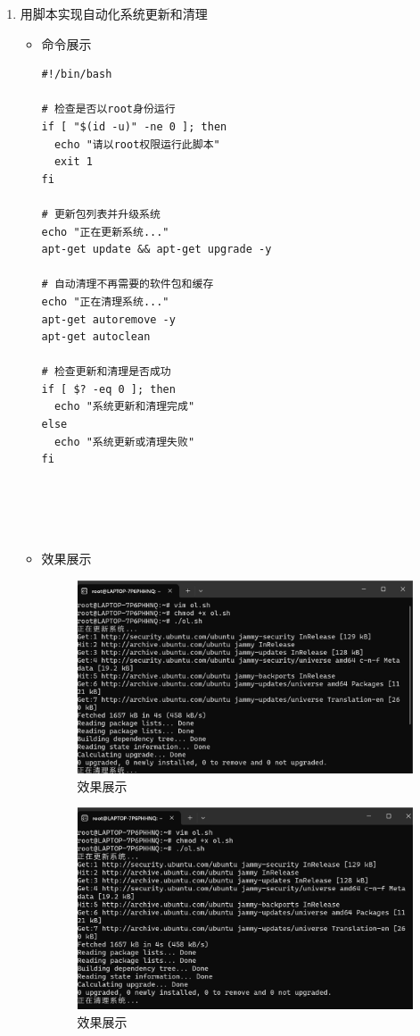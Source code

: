 \documentclass[UTF8]{ctexart}
\begin{document}
\begin{enumerate}
  \item 用脚本实现自动化系统更新和清理
  \begin{itemize}
  \item 命令展示
  \begin{verbatim}
#!/bin/bash

# 检查是否以root身份运行
if [ "$(id -u)" -ne 0 ]; then
  echo "请以root权限运行此脚本"
  exit 1
fi

# 更新包列表并升级系统
echo "正在更新系统..."
apt-get update && apt-get upgrade -y

# 自动清理不再需要的软件包和缓存
echo "正在清理系统..."
apt-get autoremove -y
apt-get autoclean

# 检查更新和清理是否成功
if [ $? -eq 0 ]; then
  echo "系统更新和清理完成"
else
  echo "系统更新或清理失败"
fi



    
  \end{verbatim}

  \item 效果展示
  \begin{figure}[H]
    \centering
    \includegraphics[width=\textwidth]{11}

    \caption{效果展示}
  
  \end{figure}
  
  \begin{figure}[H]
    \centering
   
\includegraphics[width=\textwidth]{111} %
    \caption{效果展示}
  
  \end{figure}
\end{itemize}
\end{enumerate}
\end{document}
